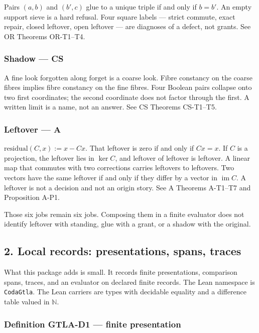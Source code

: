 \documentclass[
  11pt,
]{article}
\begin{document}
Pairs \((a,b)\) and \((b',c)\) glue to a unique triple if and only if \(b=b'\). An empty support sieve is a hard refusal. Four square labels --- strict commute, exact repair, closed leftover, open leftover --- are diagnoses of a defect, not grants. See OR Theorems OR-T1--T4.

\subsubsection{Shadow --- CS}\label{shadow-cs}

A fine look forgotten along \(\mathrm{forget}\) is a coarse look. Fibre constancy on the coarse fibres implies fibre constancy on the fine fibres. Four Boolean pairs collapse onto two first coordinates; the second coordinate does not factor through the first. A written limit is a name, not an answer. See CS Theorems CS-T1--T5.

\subsubsection{Leftover --- A}\label{leftover-a}

\(\mathrm{residual}(C,x):=x-Cx\). That leftover is zero if and only if \(Cx=x\). If \(C\) is a projection, the leftover lies in \(\ker C\), and leftover of leftover is leftover. A linear map that commutes with two corrections carries leftovers to leftovers. Two vectors have the same leftover if and only if they differ by a vector in \(\operatorname{im}C\). A leftover is not a decision and not an origin story. See A Theorems A-T1--T7 and Proposition A-P1.

Those six jobs remain six jobs. Composing them in a finite evaluator does not identify leftover with standing, glue with a grant, or a shadow with the original.

\subsection{2. Local records: presentations, spans, traces}\label{local-records-presentations-spans-traces}

What this package adds is small. It records finite presentations, comparison spans, traces, and an evaluator on declared finite records. The Lean namespace is \texttt{CodaGtla}. The Lean carriers are types with decidable equality and a difference table valued in \(\mathbb{N}\).

\subsubsection{Definition GTLA-D1 --- finite presentation}\label{definition-gtla-d1-finite-presentation}
\end{document}
